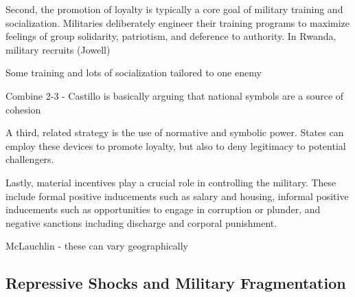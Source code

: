\documentclass[12pt,]{article}
\begin{document}
Second, the promotion of loyalty is typically a core goal of military training and socialization. Militaries deliberately engineer their training programs to maximize feelings of group solidarity, patriotism, and deference to authority. In Rwanda, military recruits (Jowell)

Some training and lots of socialization tailored to one enemy

Combine 2-3 - Castillo is basically arguing that national symbols are a source of cohesion

A third, related strategy is the use of normative and symbolic power. States can employ these devices to promote loyalty, but also to deny legitimacy to potential challengers.

Lastly, material incentives play a crucial role in controlling the military. These include formal positive inducements such as salary and housing, informal positive inducements such as opportunities to engage in corruption or plunder, and negative sanctions including discharge and corporal punishment.

McLauchlin - these can vary geographically

\hypertarget{repressive-shocks-and-military-fragmentation}{%
\subsection{Repressive Shocks and Military Fragmentation}\label{repressive-shocks-and-military-fragmentation}}
\end{document}
